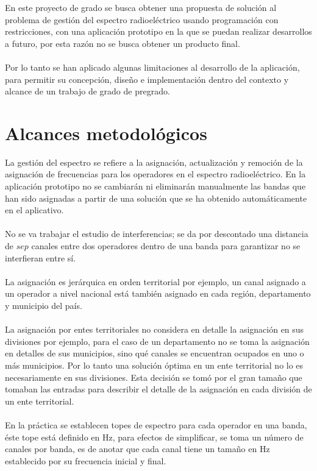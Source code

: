 En este proyecto de grado se busca obtener una propuesta de solución al problema de gestión del espectro radioeléctrico usando programación con restricciones, con una aplicación prototipo en la que se puedan realizar desarrollos a futuro, por esta razón no se busca obtener un producto final.
\\ \\
Por lo tanto se han aplicado algunas limitaciones al desarrollo de la aplicación, para permitir su concepción, diseño e implementación dentro del contexto y alcance de un trabajo de grado de pregrado.

\section{Alcances metodológicos}	

La gestión del espectro se refiere a la asignación, actualización y remoción de la asignación de frecuencias para los operadores en el espectro radioeléctrico.  En la aplicación prototipo no se cambiarán ni eliminarán manualmente las bandas que han sido asignadas a partir de una solución que se ha obtenido automáticamente en el aplicativo.
\\ \\
No se va trabajar el estudio de interferencias; se da por descontado una distancia de $sep$ canales entre dos operadores dentro de una banda para garantizar no se interfieran entre sí.
\\ \\
La asignación es jerárquica en orden territorial por ejemplo, un canal asignado a un operador a nivel nacional está también asignado en cada región, departamento y municipio del país.
\\ \\
La asignación por entes territoriales no considera en detalle la asignación en sus divisiones por ejemplo, para el caso de un departamento no se toma la asignación en detalles de sus municipios, sino qué canales se encuentran ocupados en uno o más municipios. Por lo tanto una solución óptima en un ente territorial no lo es necesariamente en sus divisiones. Esta decisión se tomó por el gran tamaño que tomaban las entradas para describir el detalle de la asignación en cada división de un ente territorial.
\\ \\
En la práctica se establecen topes de espectro para cada operador en una banda, éste tope está definido en Hz, para efectos de simplificar, se toma un número de canales por banda, es de anotar que cada canal tiene un tamaño en Hz establecido por su frecuencia inicial y final.
